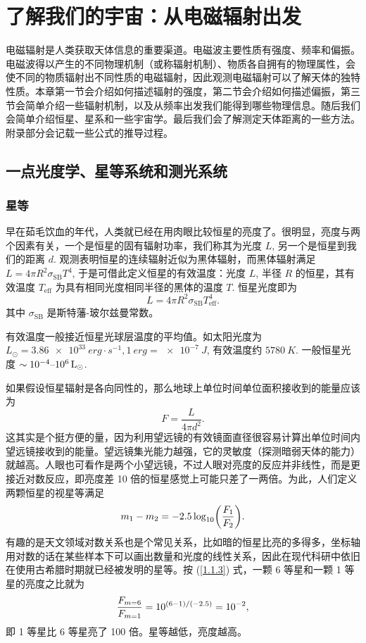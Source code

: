 \documentclass[../天体物理基础.tex]{subfiles}
\begin{document}
\section{了解我们的宇宙：从电磁辐射出发}
电磁辐射是人类获取天体信息的重要渠道。电磁波主要性质有强度、频率和偏振。电磁波得以产生的不同物理机制（或称辐射机制）、物质各自拥有的物理属性，会使不同的物质辐射出不同性质的电磁辐射，因此观测电磁辐射可以了解天体的独特性质。本章第一节会介绍如何描述辐射的强度，第二节会介绍如何描述偏振，第三节会简单介绍一些辐射机制，以及从频率出发我们能得到哪些物理信息。随后我们会简单介绍恒星、星系和一些宇宙学。最后我们会了解测定天体距离的一些方法。附录部分会记载一些公式的推导过程。

\subsection{一点光度学、星等系统和测光系统}
\subsubsection{星等}
早在茹毛饮血的年代，人类就已经在用肉眼比较恒星的亮度了。很明显，亮度与两个因素有关，一个是恒星的固有辐射功率，我们称其为光度 $L$, 另一个是恒星到我们的距离 $d$. 观测表明恒星的连续辐射近似为黑体辐射，而黑体辐射满足 $L=4\pi R^{2}\sigma_{\mathrm{SB}}T^{4}$, 于是可借此定义恒星的有效温度：光度 $L$, 半径 $R$ 的恒星，其有效温度 $T_{\mathrm{eff}}$ 为具有相同光度相同半径的黑体的温度 $T$. 恒星光度即为
\begin{equation}
L=4\pi R^{2}\sigma_{\mathrm{SB}}T_{\mathrm{eff}}^{4}.
\end{equation}
其中 $\sigma_{\mathrm{SB}}$ 是斯特藩{}-{}玻尔兹曼常数。

有效温度一般接近恒星光球层温度的平均值。如太阳光度为 $L_{\odot}=\qty{3.86e33}{erg\cdot{}s^{-1}},\qty{1}{erg}=\qty{e-7}{J}$, 有效温度约 $\qty{5780}{K}$. 一般恒星光度 $\sim10^{-4}\text{\textendash}\qty{e6}{L_{\odot}}$.

如果假设恒星辐射是各向同性的，那么地球上单位时间单位面积接收到的能量应该为
\begin{equation}
F=\frac{L}{4\pi d^{2}}.
\end{equation}
这其实是个挺方便的量，因为利用望远镜的有效镜面直径很容易计算出单位时间内望远镜接收到的能量。望远镜集光能力越强，它的灵敏度（探测暗弱天体的能力）就越高。人眼也可看作是两个小望远镜，不过人眼对亮度的反应并非线性，而是更接近对数反应，即亮度差 10 倍的恒星感觉上可能只差了一两倍。为此，人们定义两颗恒星的视星等满足
\begin{equation}
m_{1}-m_{2}=-2.5\log_{10}\mleft(\frac{F_{1}}{F_{2}}\mright).\label{1.1.3}
\end{equation}
有趣的是天文领域对数关系也是个常见关系，比如暗的恒星比亮的多得多，坐标轴用对数的话在某些样本下可以画出数量和光度的线性关系，因此在现代科研中依旧在使用古希腊时期就已经被发明的星等。按 (\ref{1.1.3}) 式，一颗 6 等星和一颗 1 等星的亮度之比就为
\begin{equation}
\frac{F_{m=6}}{F_{m=1}}=10^{\mleft(6-1\mright)/\mleft(-2.5\mright)}=10^{-2},
\end{equation}
即 1 等星比 6 等星亮了 100 倍。星等越低，亮度越高。
\end{document}
